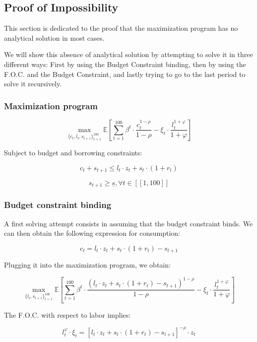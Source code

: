 \documentclass{article}
\begin{document}
\subsection{Proof of Impossibility}

This section is dedicated to the proof that the maximization program
has no analytical solution in most cases.

We will show this absence of analytical solution by attempting to solve it in three different 
ways: First by using the Budget Constraint binding, then by using the F.O.C. and the Budget Constraint,
and lastly trying to go to the last period to solve it recursively. 

\subsubsection{Maximization program}

$$ \max_{\{c_{t},l_{t},s_{t+1}\}_{t=1}^{100}}
{\mathbb{E}\left[\sum_{t=1}^{100} \beta^{t}\cdot \frac{c_{t}^{1-\rho}}{1-\rho}-\xi_{t}\cdot \frac{l_{t}^{1+\varphi}}{1+\varphi}\right]}$$

Subject to budget and borrowing constraints:

$$c_{t} + s_{t+1} \leq l_{t}\cdot z_{t} + s_{t}\cdot(1+r_{t})$$

$$s_{t+1}\geq \underline{s}, \forall t \in [\![1,100]\!]$$

\subsubsection{Budget constraint binding}

A first solving attempt consists in assuming that the budget constraint binds.
We can then obtain the following expression for consumption: 

$$c_{t} = l_{t}\cdot z_{t} + s_{t}\cdot(1+r_{t}) - s_{t+1}$$

Plugging it into the maximization program, we obtain:

$$ \max_{\{l_{t},s_{t+1}\}_{t=1}^{100}}
{\mathbb{E}\left[\sum_{t=1}^{100} \beta^{t}\cdot \frac{\left(l_{t}\cdot z_{t} + s_{t}\cdot(1+r_{t}) - s_{t+1}\right)^{1-\rho}}{1-\rho}-\xi_{t}\cdot \frac{l_{t}^{1+\varphi}}{1+\varphi}\right]}$$

The F.O.C. with respect to labor implies: 

\begin{equation}
    l_{t}^{\varphi}\cdot \xi_{t} = \left[l_{t}\cdot z_{t} + s_{t}\cdot(1+r_{t})- s_{t+1}\right]^{-\rho}\cdot z_{t}
\end{equation}
\end{document}
